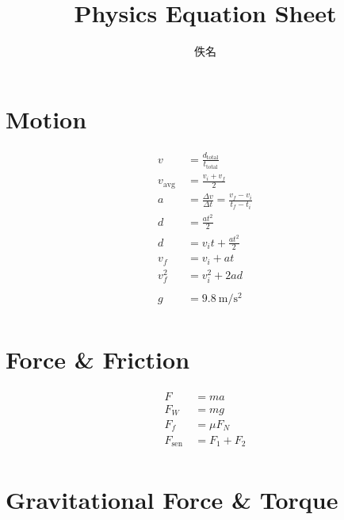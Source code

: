 \documentclass[10pt]{ctexart}
\title{\vspace*{-3cm}Physics Equation Sheet}
\author{佚名}
\begin{document}
\maketitle
\begin{multicols}{2}
    \section{Motion}

    \begin{align*}
        v                & = \frac{d_{\text{total}}}{t_{\text{total}}}                 \\
        v_{\text {avg }} & = \frac{v_{i} + v_{f}}{2}                                   \\
        a                & = \frac{\Delta v}{\Delta t}=\frac{v_{f}-v_{i}}{t_{f}-t_{i}} \\
        d                & = \frac{a t^2}{2}                                           \\
        d                & = v_{i} t+\frac{a t^{2}}{2}                                 \\
        v_{f}            & = v_{i} + a t                                               \\
        v_{f}^{2}        & = v_{i}^{2} + 2 a d                                         \\                                       \\
        g     & = 9.8 \mathrm{~m} / \mathrm{s}^{2} \\
    \end{align*}

    \section{Force \& Friction}

    \begin{align*}
        F                & = m a         \\
        F_{W}            & = m g         \\
        F_{f}            & = \mu F_{N}   \\
        F_{\text {sen }} & = F_{1}+F_{2} \\
    \end{align*}

    \section{Gravitational Force \& Torque}


\end{multicols}
\end{document}
